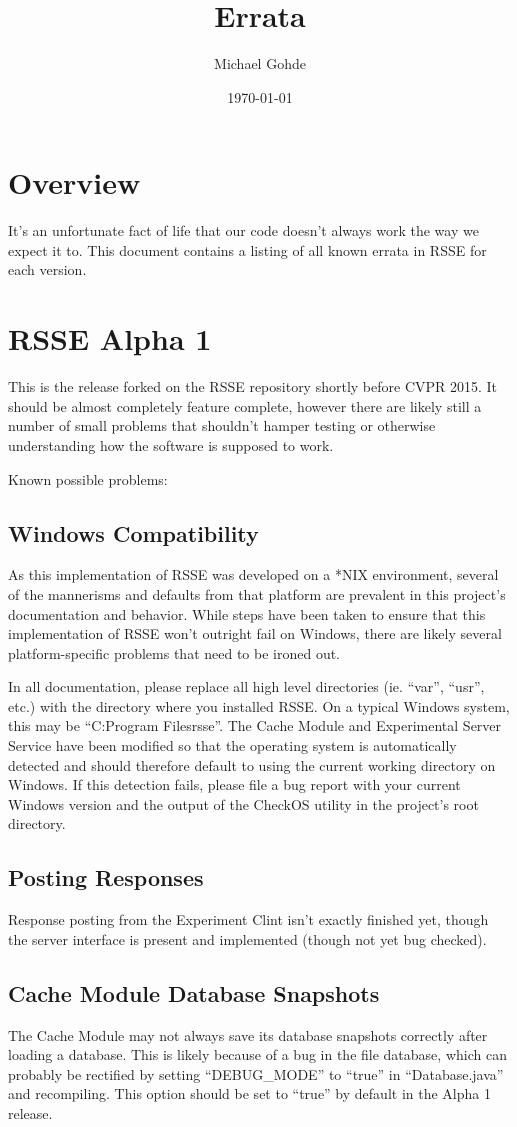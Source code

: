 \documentclass[letterpaper]{article}
\begin{document}
\title{Errata}
\author{Michael Gohde}
\date{\today}
\maketitle

\section{Overview}
It's an unfortunate fact of life that our code doesn't always work the way we expect it to. This document contains a listing of all known errata in RSSE for each version. 

\section{RSSE Alpha 1}
This is the release forked on the RSSE repository shortly before CVPR 2015. It should be almost completely feature complete, however there are likely still a number of small problems that shouldn't hamper testing or otherwise understanding how the software is supposed to work. 

Known possible problems:

\subsection{Windows Compatibility}
As this implementation of RSSE was developed on a *NIX environment, several of the mannerisms and defaults from that platform are prevalent in this project's documentation and behavior. While steps have been taken to ensure that this implementation of RSSE won't outright fail on Windows, there are likely several platform-specific problems that need to be ironed out. 

In all documentation, please replace all high level directories (ie. ``var'', ``usr'', etc.) with the directory where you installed RSSE. On a typical Windows system, this may be ``C:{\@backslashchar}Program Files{\@backslashchar}rsse''. The Cache Module and Experimental Server Service have been modified so that the operating system is automatically detected and should therefore default to using the current working directory on Windows. If this detection fails, please file a bug report with your current Windows version and the output of the CheckOS utility in the project's root directory.

\subsection{Posting Responses}
Response posting from the Experiment Clint isn't exactly finished yet, though the server interface is present and implemented (though not yet bug checked).

\subsection{Cache Module Database Snapshots}
The Cache Module may not always save its database snapshots correctly after loading a database. This is likely because of a bug in the file database, which can probably be rectified by setting ``DEBUG\_MODE'' to ``true'' in ``Database.java'' and recompiling. This option should be set to ``true'' by default in the Alpha 1 release.
\end{document}

